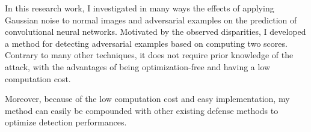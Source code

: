 \begin{summary}
	\overridetextsize
	\label{conclusion}

	In this research work, I investigated in many ways the effects of applying
	Gaussian noise to normal images and adversarial examples on the prediction of
	convolutional neural networks. Motivated by the observed disparities, I
	developed a method for detecting adversarial examples based on computing two
	scores. Contrary to many other techniques, it does not require prior knowledge
	of the attack, with the advantages of being optimization-free and having a low
	computation cost.

	Moreover, because of the low computation cost and easy implementation, my method
	can easily be compounded with other existing defense methods to optimize
	detection performances.
\end{summary}
